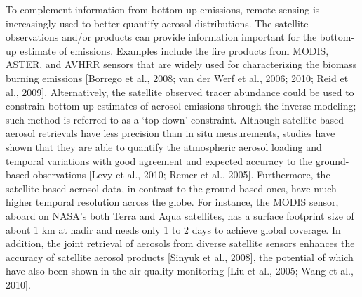 To complement information from bottom-up emissions, remote sensing is increasingly used 
 to better quantify aerosol distributions. 
 The satellite observations and/or products can provide information important 
 for the bottom-up estimate of emissions. 
 Examples include the fire products from MODIS, ASTER, and AVHRR sensors 
 that are widely used for characterizing the biomass burning emissions 
 [Borrego et al., 2008; van der Werf et al., 2006; 2010; Reid et al., 2009]. 
 Alternatively, the satellite observed tracer abundance could be used 
 to constrain bottom-up estimates of aerosol emissions through the inverse modeling; 
 such method is referred to as a ‘top-down’ constraint. 
 Although satellite-based aerosol retrievals have less precision than in situ measurements, 
 studies have shown that they are able to quantify the atmospheric aerosol loading 
 and temporal variations with good agreement and expected accuracy 
 to the ground-based observations [Levy et al., 2010; Remer et al., 2005]. 
 Furthermore, the satellite-based aerosol data, in contrast to the ground-based ones, 
 have much higher temporal resolution across the globe. For instance, the MODIS sensor, 
 aboard on NASA’s both Terra and Aqua satellites, has a surface footprint size of 
 about 1 km at nadir and needs only 1 to 2 days to achieve global coverage. 
 In addition, the joint retrieval of aerosols from diverse satellite sensors 
 enhances the accuracy of satellite aerosol products [Sinyuk et al., 2008], 
 the potential of which have also been shown in the air quality monitoring 
 [Liu et al., 2005; Wang et al., 2010]. 

